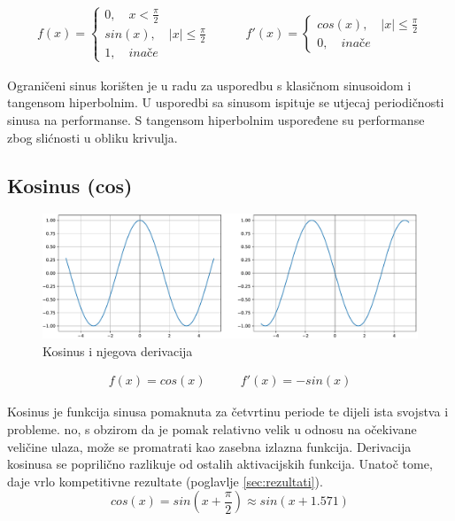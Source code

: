 \documentclass[times, utf8, numeric, diplomski]{fer}
\def\otherwise{\textit{inače}}
\def\secref#1{(poglavlje \ref{#1})}
\begin{document}
\begin{equation}
\label{eq:trsin}
\begin{split}
f(x) =
\begin{cases}
0, \quad x < \frac{\pi}{2} \\
sin(x), \quad |x| \leq \frac{\pi}{2} \\
1, \quad \otherwise
\end{cases}
\end{split}
\qquad
\begin{split}
f'(x) =
\begin{cases}
cos(x), \quad |x| \leq \frac{\pi}{2} \\
0, \quad \otherwise
\end{cases}
\end{split}
\end{equation}

Ograničeni sinus korišten je u radu \citet{taming_waves} za usporedbu s klasičnom sinusoidom i tangensom hiperbolnim. U usporedbi sa sinusom ispituje se utjecaj periodičnosti sinusa na performanse. S tangensom hiperbolnim uspoređene su performanse zbog slićnosti u obliku krivulja.

\subsection{Kosinus (cos)}

\begin{figure}[H]
\includegraphics[width=\textwidth]{Cos.pdf}
\centering
\caption{Kosinus i njegova derivacija}
\label{fig:cos}
\end{figure}

\begin{equation}
\label{eq:cos}
\begin{split}
f(x) = cos(x)
\end{split}
\qquad
\begin{split}
f'(x) = -sin(x)
\end{split}
\end{equation}

Kosinus je funkcija sinusa pomaknuta za četvrtinu periode te dijeli ista svojstva i probleme. no, s obzirom da je pomak relativno velik u odnosu na očekivane veličine ulaza, može se promatrati kao zasebna izlazna funkcija. Derivacija kosinusa se poprilično razlikuje od ostalih aktivacijskih funkcija. Unatoč tome, daje vrlo kompetitivne rezultate \secref{sec:rezultati}.
\begin{equation}
cos(x) = sin(x + \frac{\pi}{2}) \approx sin(x + 1.571)
\end{equation}
\end{document}
